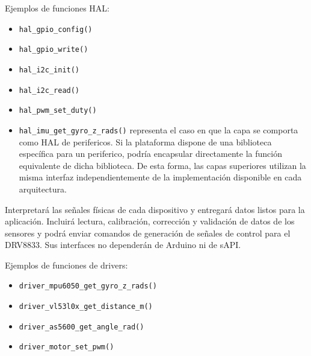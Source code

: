 \begin{description}
        \begin{visar}
Ejemplos de funciones HAL:
\begin{itemize}

  \item \texttt{hal\_gpio\_config()} 

  \item \texttt{hal\_gpio\_write()} 

  \item \texttt{hal\_i2c\_init()} 

  \item \texttt{hal\_i2c\_read()} 

  \item \texttt{hal\_pwm\_set\_duty()} 


  \item \texttt{hal\_imu\_get\_gyro\_z\_rads()} representa el caso en que la capa se comporta como HAL de perifericos. Si la plataforma dispone de una
        biblioteca específica para un periferico, podría encapsular directamente
        la función equivalente de dicha biblioteca. De esta forma, las capas
        superiores utilizan la misma interfaz independientemente de la
        implementación disponible en cada arquitectura.

\end{itemize}
        \end{visar}


  \item[Capa 2 --- Drivers de dispositivos.]
        Interpretará las señales físicas de cada dispositivo y entregará datos
        listos para la aplicación. Incluirá lectura, calibración, corrección y
        validación de datos de los sensores y podrá enviar comandos de
        generación de señales de control para el DRV8833. Sus interfaces no
        dependerán de Arduino ni de sAPI.

        \begin{visar}
Ejemplos de funciones de drivers:
\begin{itemize}

  \item \texttt{driver\_mpu6050\_get\_gyro\_z\_rads()}

  \item \texttt{driver\_vl53l0x\_get\_distance\_m()}

  \item \texttt{driver\_as5600\_get\_angle\_rad()} 

  \item \texttt{driver\_motor\_set\_pwm()}


\end{itemize}
\end{visar}
\end{description}
